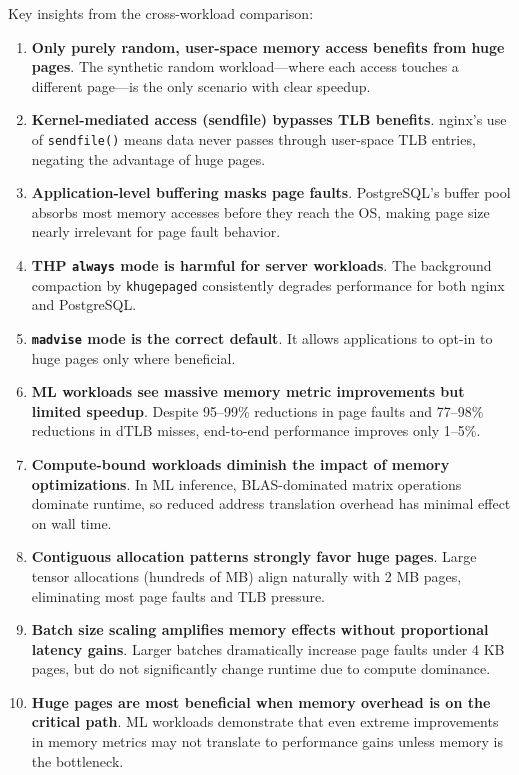 \documentclass[conference]{IEEEtran}
\begin{document}
Key insights from the cross-workload comparison:
\begin{enumerate}
    \item \textbf{Only purely random, user-space memory access benefits from huge pages}. The synthetic random workload---where each access touches a different page---is the only scenario with clear speedup.
    
    \item \textbf{Kernel-mediated access (sendfile) bypasses TLB benefits}. nginx's use of \texttt{sendfile()} means data never passes through user-space TLB entries, negating the advantage of huge pages.
    
    \item \textbf{Application-level buffering masks page faults}. PostgreSQL's buffer pool absorbs most memory accesses before they reach the OS, making page size nearly irrelevant for page fault behavior.
    
    \item \textbf{THP \texttt{always} mode is harmful for server workloads}. The background compaction by \texttt{khugepaged} consistently degrades performance for both nginx and PostgreSQL.
    
    \item \textbf{\texttt{madvise} mode is the correct default}. It allows applications to opt-in to huge pages only where beneficial.

    \item \textbf{ML workloads see massive memory metric improvements but limited speedup}. Despite 95--99\% reductions in page faults and 77--98\% reductions in dTLB misses, end-to-end performance improves only 1--5\%.

    \item \textbf{Compute-bound workloads diminish the impact of memory optimizations}. In ML inference, BLAS-dominated matrix operations dominate runtime, so reduced address translation overhead has minimal effect on wall time.

    \item \textbf{Contiguous allocation patterns strongly favor huge pages}. Large tensor allocations (hundreds of MB) align naturally with 2 MB pages, eliminating most page faults and TLB pressure.

    \item \textbf{Batch size scaling amplifies memory effects without proportional latency gains}. Larger batches dramatically increase page faults under 4 KB pages, but do not significantly change runtime due to compute dominance.

    \item \textbf{Huge pages are most beneficial when memory overhead is on the critical path}. ML workloads demonstrate that even extreme improvements in memory metrics may not translate to performance gains unless memory is the bottleneck.
\end{enumerate}
\end{document}
